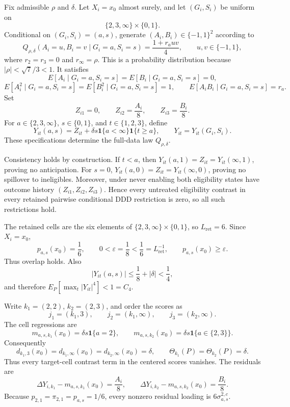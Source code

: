 Fix admissible \(\rho\) and \(\delta\). Let \(X_i=x_0\) almost surely, and let \((G_i,S_i)\) be uniform on
\[
 \{2,3,\infty\}\times\{0,1\}.
\]
Conditional on \((G_i,S_i)=(a,s)\), generate \((A_i,B_i)\in\{-1,1\}^2\) according to
\[
 Q_{\rho,\delta}(A_i=u,B_i=v\mid G_i=a,S_i=s)
 =\frac{1+r_a uv}{4},
 \qquad u,v\in\{-1,1\},
\]
where \(r_2=r_3=0\) and \(r_\infty=\rho\). This is a probability distribution because \(|\rho|<\sqrt7/3<1\). It satisfies
\[
 E[A_i\mid G_i=a,S_i=s]=E[B_i\mid G_i=a,S_i=s]=0,
\]
\[
 E[A_i^2\mid G_i=a,S_i=s]=E[B_i^2\mid G_i=a,S_i=s]=1,
 \qquad
 E[A_iB_i\mid G_i=a,S_i=s]=r_a.
\]
Set
\[
 Z_{i1}=0,
 \qquad Z_{i2}=\frac{A_i}{8},
 \qquad Z_{i3}=\frac{B_i}{8}.
\]
For \(a\in\{2,3,\infty\}\), \(s\in\{0,1\}\), and \(t\in\{1,2,3\}\), define
\[
 Y_{it}(a,s)
 =Z_{it}+\delta s\mathbf 1\{a<\infty\}\mathbf 1\{t\ge a\},
 \qquad
 Y_{it}=Y_{it}(G_i,S_i).
\]
These specifications determine the full-data law \(Q_{\rho,\delta}\).

Consistency holds by construction. If \(t<a\), then \(Y_{it}(a,1)=Z_{it}=Y_{it}(\infty,1)\), proving no anticipation. For \(s=0\), \(Y_{it}(a,0)=Z_{it}=Y_{it}(\infty,0)\), proving no spillover to ineligibles. Moreover, under never enabling both eligibility states have outcome history \((Z_{i1},Z_{i2},Z_{i3})\). Hence every untreated eligibility contrast in every retained pairwise conditional DDD restriction is zero, so all such restrictions hold.

The retained cells are the six elements of \(\{2,3,\infty\}\times\{0,1\}\), so \(L_{\mathrm{ret}}=6\). Since \(X_i=x_0\),
\[
 p_{a,s}(x_0)=\frac16,
 \qquad
 0<\varepsilon=\frac18<\frac16=L_{\mathrm{ret}}^{-1},
 \qquad
 p_{a,s}(x_0)\ge\varepsilon.
\]
Thus overlap holds. Also
\[
 |Y_{it}(a,s)|\le\frac18+|\delta|<\frac14,
\]
and therefore \(E_P[\max_t|Y_{it}|^4]<1=C_4\).

Write \(k_1=(2,2)\), \(k_2=(2,3)\), and order the scores as
\[
 j_1=(k_1,3),
 \qquad j_2=(k_1,\infty),
 \qquad j_3=(k_2,\infty).
\]
The cell regressions are
\[
 m_{a,s,k_1}(x_0)=\delta s\mathbf 1\{a=2\},
 \qquad
 m_{a,s,k_2}(x_0)=\delta s\mathbf 1\{a\in\{2,3\}\}.
\]
Consequently
\[
 d_{k_1,3}(x_0)=d_{k_1,\infty}(x_0)
 =d_{k_2,\infty}(x_0)=\delta,
 \qquad
 \Theta_{k_1}(P)=\Theta_{k_2}(P)=\delta.
\]
Thus every target-cell contrast term in the centered scores vanishes. The residuals are
\[
 \Delta Y_{i,k_1}-m_{a,s,k_1}(x_0)=\frac{A_i}{8},
 \qquad
 \Delta Y_{i,k_2}-m_{a,s,k_2}(x_0)=\frac{B_i}{8}.
\]
Because \(p_{2,1}=\pi_{2,1}=p_{a,s}=1/6\), every nonzero residual loading is \(6\sigma_{a,s}^{2,c}\).

